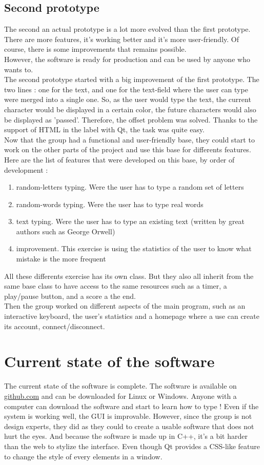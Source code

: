 \section{Second prototype}
The second an actual prototype is a lot more evolved than the first prototype. There are more features, it's working better and it's more user-friendly. Of course, there is some improvements that remains possible.\\
However, the software is ready for production and can be used by anyone who wants to.\\
The second prototype started with a big improvement of the first prototype. The two lines : one for the text, and one for the text-field where the user can type were merged into a single one. So, as the user would type the text, the current character would be displayed in a certain color, the future characters would also be displayed as 'passed'. Therefore, the offset problem was solved. Thanks to the support of HTML in the label with Qt, the task was quite easy.\\
Now that the group had a functional and user-friendly base, they could start to work on the other parts of the project and use this base for differents features.\\
Here are the list of features that were developed on this base, by order of development :
\begin{enumerate}
	\item random-letters typing. Were the user has to type a random set of letters
	\item random-words typing. Were the user has to type real words
	\item text typing. Were the user has to type an existing text (written by great authors such as George Orwell)
	\item improvement. This exercise is using the statistics of the user to know what mistake is the more frequent
\end{enumerate}
All these differents exercise has its own class. But they also all inherit from the same base class to have access to the same resources such as a timer, a play/pause button, and a score a the end.\\
Then the group worked on different aspects of the main program, such as an interactive keyboard, the user's statistics and a homepage where a use can create its account, connect/disconnect.


\chapter{Current state of the software}
The current state of the software is complete. The software is available on \url{github.com} and can be downloaded for Linux or Windows. Anyone with a computer can download the software and start to learn how to type !
Even if the system is working well, the GUI is improvable. However, since the group is not design experts, they did as they could to create a usable software that does not hurt the eyes. And because the software is made up in C++, it's a bit harder than the web to stylize the interface. Even though Qt provides a CSS-like feature to change the style of every elements in a window.



